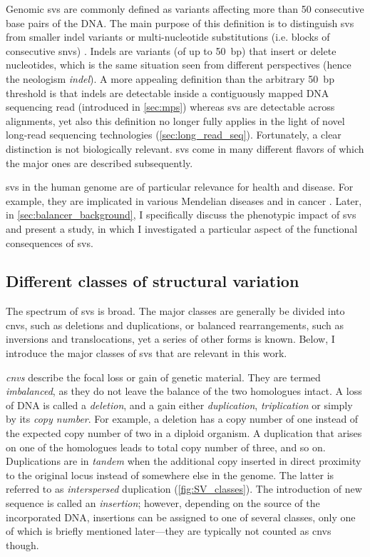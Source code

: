 Genomic \acfp{sv} are commonly defined as variants affecting more than
50 consecutive base pairs of the DNA. The main purpose of this definition is to
distinguish \acp{sv} from smaller indel variants or multi-nucleotide substitutions
(i.e. blocks of consecutive \acp{snv}) \citep{Alkan2011}. Indels are variants
(of up to 50~bp) that insert or delete nucleotides, which is the same situation
seen from different perspectives (hence the neologism \textit{indel}).
A more appealing definition than the arbitrary 50~bp threshold is that indels
are detectable inside a contiguously mapped DNA sequencing read (introduced in
\cref{sec:mps}) whereas \acp{sv} are detectable across alignments, yet also
this definition no longer fully applies in the light of novel long-read
sequencing technologies (\cref{sec:long_read_seq}). Fortunately, a clear
distinction is not biologically relevant. \Acp{sv} come in many different
flavors of which the major ones are described subsequently.

\Acp{sv} in the human genome are of particular relevance for health and disease.
For example, they are implicated in various Mendelian diseases and in cancer
\citep{Weischenfeldt2013}.
Later, in \cref{sec:balancer_background}, I specifically discuss the phenotypic
impact of \acp{sv} and present a study, in which I investigated a particular
aspect of the functional consequences of \acp{sv}.




\subsection{Different classes of structural variation}
\label{sec:sv_classes}

The spectrum of \aclp{sv} is broad. The major \sv classes are generally be
divided into \aclp{cnv}, such as deletions and
duplications, or balanced rearrangements, such as inversions and translocations,
yet a series of other \sv forms is known. Below, I introduce the major classes
of \acp{sv} that are relevant in this work.

\emph{\Acfp{cnv}} describe the focal loss or gain of genetic material. They are
termed \emph{imbalanced}, as they do not leave the balance of the two homologues
intact. A loss of DNA is called a \emph{deletion}, and a gain either
\emph{duplication}, \emph{triplication} or simply by its \emph{copy number}.
For example, a deletion has a copy number of one instead of the expected copy
number of two in a diploid organism. A duplication that arises on one of the
homologues leads to total copy number of three, and so on.
Duplications are in \emph{tandem} when the additional copy inserted in direct
proximity to the original locus instead of somewhere else in the genome. The
latter is referred to as \emph{interspersed} duplication (\cref{fig:SV_classes}).
The introduction of new sequence is called an \emph{insertion}; however,
depending on the source of the incorporated DNA, insertions can be assigned to
one of several classes, only one of which is briefly mentioned later---they are
typically not counted as \acp{cnv} though.


